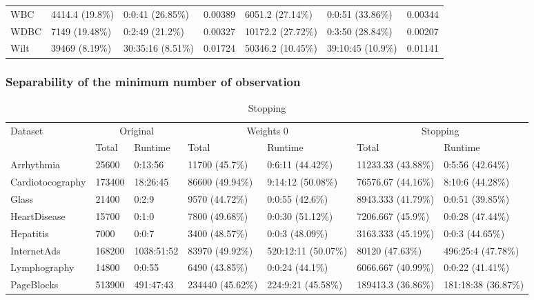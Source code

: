 \documentclass[11pt]{article}
\begin{document}
{\begin{table}[h!]
\begin{tabular}{|l|lll|lll|}
    WBC                            & 4414.4 (19.8\%) & 0:0:41 (26.85\%)  &  0.00389 & 6051.2 (27.14\%) & 0:0:51 (33.86\%)  &  0.00344         \\
    WDBC                           & 7149 (19.48\%) & 0:2:49 (21.2\%)  &  0.00327 & 10172.2 (27.72\%) & 0:3:50 (28.84\%)  &  0.00207       \\
    Wilt                           & 39469 (8.19\%) & 30:35:16 (8.51\%)  &  0.01724 & 50346.2 (10.45\%) & 39:10:45 (10.9\%)  &  0.01141       \\ \hline
\end{tabular}
\end{table}

\subsubsection{Separability of the minimum number of observation}
\begin{table}[h!]
\footnotesize
\centering
\caption{Stopping}
\label{tab:stopping}
\begin{tabular}{|l|ll|ll|ll|}
\hline
\multirow{2}{*}{Dataset} & \multicolumn{2}{c|}{Original} &  \multicolumn{2}{c|}{Weights 0} & \multicolumn{2}{c|}{Stopping} \\ \cline{2-7} 
                                   & Total        & Runtime    & Total  & Runtime  & Total   & Runtime      \\ \hline
        Arrhythmia & 25600 & 0:13:56 & 11700 (45.7\%) & 0:6:11 (44.42\%) & 11233.33 (43.88\%) & 0:5:56 (42.64\%) \\
        Cardiotocography & 173400 & 18:26:45 & 86600 (49.94\%) & 9:14:12 (50.08\%) & 76576.67 (44.16\%) & 8:10:6 (44.28\%) \\
        Glass & 21400 & 0:2:9 & 9570 (44.72\%) & 0:0:55 (42.6\%) & 8943.333 (41.79\%) & 0:0:51 (39.85\%) \\
        HeartDisease & 15700 & 0:1:0 & 7800 (49.68\%) & 0:0:30 (51.12\%) & 7206.667 (45.9\%) & 0:0:28 (47.44\%) \\
        Hepatitis & 7000 & 0:0:7 & 3400 (48.57\%) & 0:0:3 (48.09\%) & 3163.333 (45.19\%) & 0:0:3 (44.65\%) \\
        InternetAds & 168200 & 1038:51:52 & 83970 (49.92\%) & 520:12:11 (50.07\%) & 80120 (47.63\%) & 496:25:4 (47.78\%) \\
        Lymphography & 14800 & 0:0:55 & 6490 (43.85\%) & 0:0:24 (44.1\%) & 6066.667 (40.99\%) & 0:0:22 (41.41\%) \\
        PageBlocks & 513900 & 491:47:43 & 234440 (45.62\%) & 224:9:21 (45.58\%) & 189413.3 (36.86\%) & 181:18:38 (36.87\%) \\

\end{tabular}
\end{table}}
\end{document}
